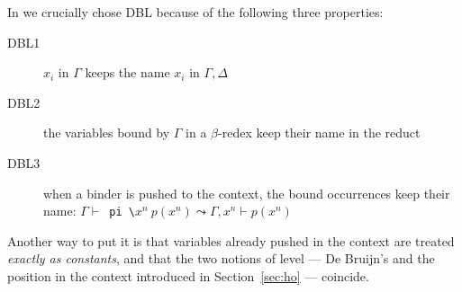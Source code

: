 \documentclass{llncs}
\begin{document}
In \elpi{} we crucially chose DBL because of the following three properties:
\begin{description}
\item[DBL1] $x_i$ in $\Gamma$ keeps the name $x_i$ in $\Gamma, \Delta$
\item[DBL2] the variables bound by $\Gamma$ in a $\beta$-redex keep their name in the reduct
\item[DBL3] when a binder is pushed to the context, the bound occurrences keep
 their name: $\Gamma \vdash $\verb+ pi \+$ x^n \ p(x^n) \leadsto \Gamma, x^n \vdash p(x^n)$
\end{description}
Another way to put it is that variables already pushed in the context
are treated \emph{exactly as constants}, and that the two notions of level
--- De Bruijn's and the position in the context introduced in Section~\ref{sec:ho} --- coincide.

%
\end{document}
